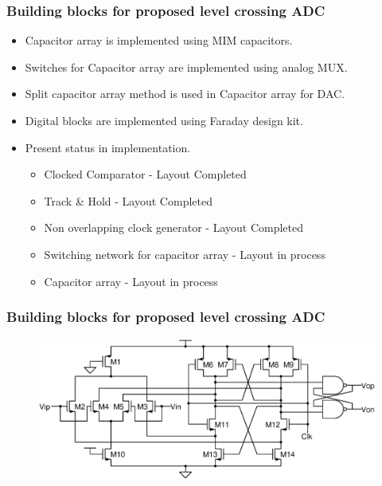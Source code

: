 \begin{frame}
	\frametitle{Building blocks for proposed level crossing ADC} \footnotesize
	\begin{itemize}  
		\item{ Capacitor array is implemented using MIM capacitors. } \\
		\item{ Switches for Capacitor array are implemented using analog MUX. } \\
		\item{ Split capacitor array method is used in Capacitor array for DAC. } \\
		\item{ Digital blocks are implemented using Faraday design kit. } \\
		\item{ Present status in implementation. } \\
			\begin{itemize} \scriptsize
				\item{ Clocked Comparator - Layout Completed} \\
				\item{ Track \& Hold - Layout Completed} \\
				\item{ Non overlapping clock generator - Layout Completed} \\
				\item{ Switching network for capacitor array - Layout in process} \\
				\item{ Capacitor array - Layout in process } \\
			\end{itemize}
	\end{itemize}
\end{frame}
\begin{frame}
	\frametitle{Building blocks for proposed level crossing ADC} \footnotesize
	\begin{center}
		\begin{figure}
			\includegraphics[width=10 cm]{Figures/CMP.eps}\\
		\end{figure}
		\scriptsize{ \color{blue}{Clocked Comparator used in proposed ADC architecture}}
	\end{center}
\end{frame}
